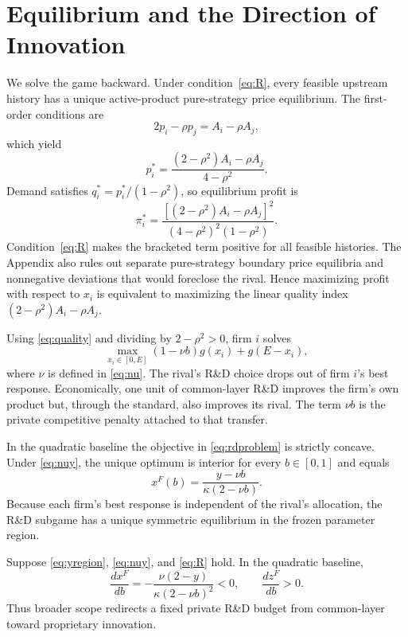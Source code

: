 \section{Equilibrium and the Direction of Innovation}

We solve the game backward. Under condition~\eqref{eq:R}, every feasible upstream history has a unique active-product pure-strategy price equilibrium. The first-order conditions are
\begin{equation}
 2p_i-\rho p_j=A_i-\rho A_j,
\end{equation}
which yield
\begin{equation}
 p_i^*=\frac{(2-\rho^2)A_i-\rho A_j}{4-\rho^2}.
 \label{eq:price}
\end{equation}
Demand satisfies $q_i^*=p_i^*/(1-\rho^2)$, so equilibrium profit is
\begin{equation}
 \pi_i^*=\frac{\left[(2-\rho^2)A_i-\rho A_j\right]^2}
 {(4-\rho^2)^2(1-\rho^2)}.
 \label{eq:profit}
\end{equation}
Condition~\eqref{eq:R} makes the bracketed term positive for all feasible histories. The Appendix also rules out separate pure-strategy boundary price equilibria and nonnegative deviations that would foreclose the rival. Hence maximizing profit with respect to $x_i$ is equivalent to maximizing the linear quality index $(2-\rho^2)A_i-\rho A_j$.

Using \eqref{eq:quality} and dividing by $2-\rho^2>0$, firm $i$ solves
\begin{equation}
 \max_{x_i\in[0,E]}
 \left(1-\nu b\right)g(x_i)+g(E-x_i),
 \label{eq:rdproblem}
\end{equation}
where $\nu$ is defined in \eqref{eq:nu}. The rival's R\&D choice drops out of firm $i$'s best response. Economically, one unit of common-layer R\&D improves the firm's own product but, through the standard, also improves its rival. The term $\nu b$ is the private competitive penalty attached to that transfer.

In the quadratic baseline the objective in \eqref{eq:rdproblem} is strictly concave. Under \eqref{eq:nuy}, the unique optimum is interior for every $b\in[0,1]$ and equals
\begin{equation}
 x^F(b)=\frac{y-\nu b}{\kappa(2-\nu b)}.
 \label{eq:xprivate}
\end{equation}
Because each firm's best response is independent of the rival's allocation, the R\&D subgame has a unique symmetric equilibrium in the frozen parameter region.

\begin{proposition}\label{prop:private}
Suppose \eqref{eq:yregion}, \eqref{eq:nuy}, and \eqref{eq:R} hold. In the quadratic baseline,
\begin{equation}
 \frac{dx^F}{db}
 =-\frac{\nu(2-y)}{\kappa(2-\nu b)^2}<0,
 \qquad
 \frac{dz^F}{db}>0.
\end{equation}
Thus broader scope redirects a fixed private R\&D budget from common-layer toward proprietary innovation.
\end{proposition}

